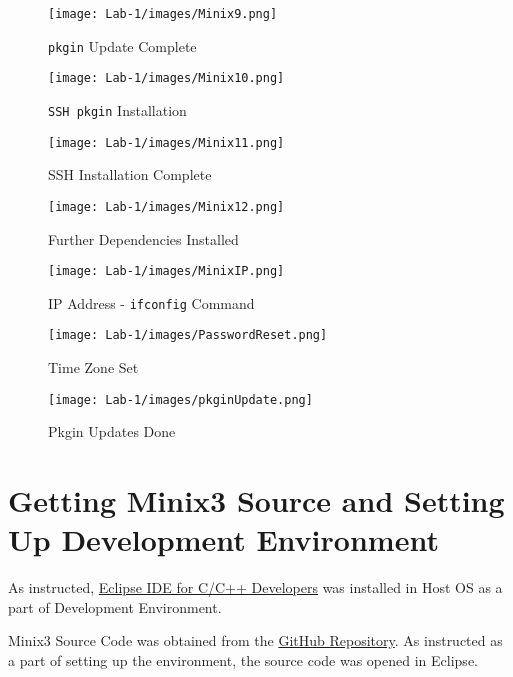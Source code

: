 \documentclass[12pt]{article}
\begin{document}
\begin{figure}
    \centering
    \texttt{[image: Lab-1/images/Minix9.png]}
    \caption{\texttt{pkgin} Update Complete}
\end{figure}

\begin{figure}
    \centering
    \texttt{[image: Lab-1/images/Minix10.png]}
    \caption{\texttt{SSH pkgin} Installation}
\end{figure}

\begin{figure}
    \centering
    \texttt{[image: Lab-1/images/Minix11.png]}
    \caption{SSH Installation Complete}
\end{figure}

\begin{figure}
    \centering
    \texttt{[image: Lab-1/images/Minix12.png]}
    \caption{Further Dependencies Installed}
\end{figure}

\begin{figure}
    \centering
    \texttt{[image: Lab-1/images/MinixIP.png]}
    \caption{IP Address - \texttt{ifconfig} Command}
\end{figure}

\begin{figure}
    \centering
    \texttt{[image: Lab-1/images/PasswordReset.png]}
    \caption{Time Zone Set}
\end{figure}

\begin{figure}
    \centering
    \texttt{[image: Lab-1/images/pkginUpdate.png]}
    \caption{Pkgin Updates Done}
\end{figure}

\section{Getting Minix3 Source and Setting Up Development Environment}
As instructed, \href{https://www.eclipse.org/downloads/packages/release/2020-12/r/eclipse-ide-cc-developers}{Eclipse IDE for C/C++ Developers} was installed in Host OS as a part of Development Environment.

Minix3 Source Code was obtained from the \href{https://github.com/Stichting-MINIX-Research-Foundation/minix}{GitHub Repository}. As instructed as a part of setting up the environment, the source code was opened in Eclipse.
\end{document}

